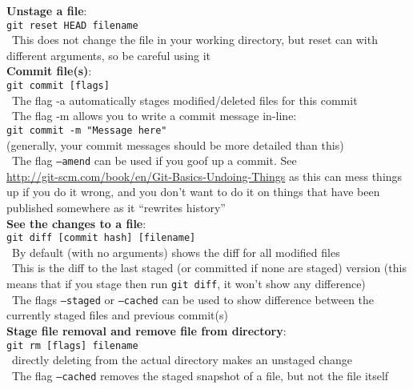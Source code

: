 \documentclass[12pt]{article}
\begin{document}
{{\bf Unstage a file}:\\
\texttt{git reset HEAD filename}\\
\textbullet\, This does not change the file in your working directory, but reset can with different arguments, so be careful using it\\

{\bf Commit file(s)}:\\
\texttt{git commit [flags]}\\
\textbullet\, The flag -a automatically stages modified/deleted files for this commit\\
\textbullet\, The flag -m allows you to write a commit message in-line:\\
 \hspace*{6mm}\texttt{git commit -m "Message here"}\\
 (generally, your commit messages should be more detailed than this)\\
\textbullet\, The flag \texttt{--amend} can be used if you goof up a commit. See\\ \url{http://git-scm.com/book/en/Git-Basics-Undoing-Things} as this can mess things up if you do it wrong, and you don't want to do it on things that have been published somewhere as it ``rewrites history''\\

{\bf See the changes to a file}:\\
\texttt{git diff [commit hash] [filename]}\\
\textbullet\, By default (with no arguments) shows the diff for all modified files\\
\textbullet\, This is the diff to the last staged (or committed if none are staged) version (this means that if you stage then run \texttt{git diff}, it won't show any difference)\\
\textbullet\, The flags \texttt{--staged} or \texttt{--cached} can be used to show difference between the currently staged files and previous commit(s)\\

{\bf Stage file removal and remove file from directory}:\\
\texttt{git rm [flags] filename}\\
\textbullet\, directly deleting from the actual directory makes an unstaged change\\
\textbullet\, The flag \texttt{--cached} removes the staged snapshot of a file, but not the file itself\\

}
\end{document}
